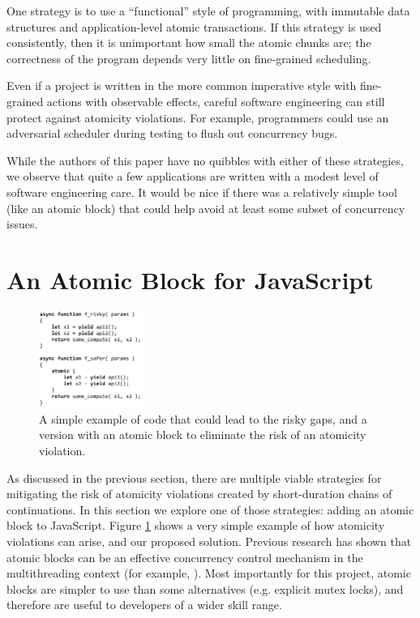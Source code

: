 \documentclass[acmsmall,anonymous,review]{acmart}\settopmatter{printfolios=true,printccs=false,printacmref=false}
\begin{document}
One strategy is to use a ``functional'' style of programming, with immutable data structures and application-level atomic transactions.
If this strategy is used consistently, then it is unimportant how small the atomic chunks are; the correctness of the program depends very little on fine-grained scheduling.

Even if a project is written in the more common imperative style with fine-grained actions with observable effects, careful software engineering can still protect against atomicity violations.
For example, programmers could use an adversarial scheduler during testing to flush out concurrency bugs.

While the authors of this paper have no quibbles with either of these strategies, we observe that quite a few applications are written with a modest level of software engineering care.
It would be nice if there was a relatively simple tool (like an atomic block) that could help avoid at least some subset of concurrency issues.

\section{An Atomic Block for JavaScript}

\begin{figure}
\includegraphics[width=0.3\textwidth,left]{async_atomic_js}
\caption{A simple example of code that could lead to the risky gaps, and a version with an atomic block to eliminate the risk of an atomicity violation.}
\label{fig:async_atomic_js}
\end{figure}

As discussed in the previous section, there are multiple viable strategies for mitigating the risk of atomicity violations created by short-duration chains of continuations.
In this section we explore one of those strategies: adding an atomic block to JavaScript.
Figure \ref{fig:async_atomic_js} shows a very simple example of how atomicity violations can arise, and our proposed solution.
Previous research has shown that atomic blocks can be an effective concurrency control mechanism in the multithreading context (for example, \cite{Harris2005, Grossman2007, Pankratius2014}).
Most importantly for this project, atomic blocks are simpler to use than some alternatives (e.g. explicit mutex locks), and therefore are useful to developers of a wider skill range\footnotemark{}.
\end{document}
